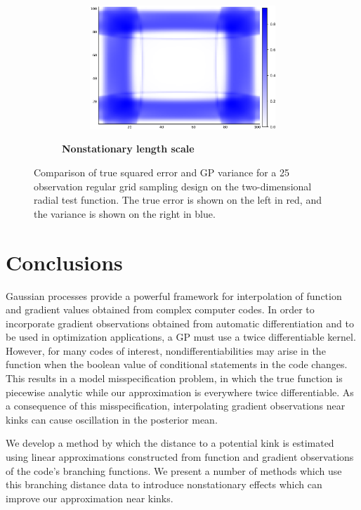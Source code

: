 \documentclass{article}
\numberwithin{equation}{section}
\begin{document}
\begin{figure}
\begin{subfigure}[b]{.5\textwidth}
\begin{subfigure}[b]{.5\textwidth}
        \includegraphics[scale=0.27]{figures/heatmaps/variance-length-25.png}
      \end{subfigure}
      \caption{\textbf{Nonstationary length scale}}
    \end{subfigure}
		\caption{Comparison of true squared error and GP variance for a 25 observation regular grid sampling design on the two-dimensional radial test function. The true error is shown on the left in red, and the variance is shown on the right in blue.}
		\label{variance}
\end{figure}

\section{Conclusions}
Gaussian processes provide a powerful framework for interpolation of function and gradient values obtained from complex computer codes. In order to incorporate gradient observations obtained from automatic differentiation and to be used in optimization applications, a GP must use a twice differentiable kernel. However, for many codes of interest, nondifferentiabilities may arise in the function when the boolean value of conditional statements in the code changes. This results in a model misspecification problem, in which the true function is piecewise analytic while our approximation is everywhere twice differentiable. As a consequence of this misspecification, interpolating gradient observations near kinks can cause oscillation in the posterior mean.

We develop a method by which the distance to a potential kink is estimated using linear approximations constructed from function and gradient observations of the code's branching functions. We present a number of methods which use this branching distance data to introduce nonstationary effects which can improve our approximation near kinks.
\end{document}
